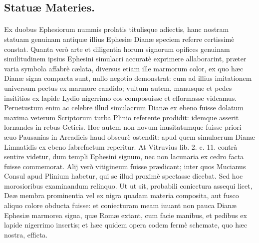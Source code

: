 \documentclass[a4paper, 11pt, oneside, polutonikogreek, latin]{article}
\begin{document}
\subsection{Statuæ Materies.}
\paragraph{}
Ex duobus Ephesiorum nummis prolatis titulisque adiectis, hanc nostram statuam genuinam antiquæ illius Ephesiæ Dianæ speciem referre certissimè constat. Quanta verò arte et diligentia horum signorum opifices genuinam similitudinem ipsius Ephesini simulacri accuratè exprimere allaborarint, præter varia symbola affabrè cælata, diversus etiam ille marmorum color, ex quo hæc Dianæ signa compacta sunt, nullo negotio demonstrat: cum ad illius imitationem universum pectus ex marmore candido; vultum autem, manusque et pedes insititios ex lapide Lydio nigerrimo eos composuisse et efformasse videamus. Peruetustum enim ac celebre illud simulacrum Dianæ ex ebeno fuisse dolatum maxima veterum Scriptorum turba Plinio referente prodidit: idemque asserit lornandes in rebus Geticis. Hoc autem non novum inusitatumque fuisse priori æuo Pausanias in Arcadicis haud obscurè ostendit: apud quem simulacrum Dianæ Limnatidis ex ebeno fabrefactum reperitur. At Vitruvius lib. 2. c. 11. contrà sentire videtur, dum templi Ephesini signum, nec non lacunaria ex cedro facta fuisse commemorat. Alij verò vitigineum fuisse prædicant; inter quos Mucianus Consul apud Plinium habetur, qui se illud proximè spectasse dicebat. Sed hoc morosioribus examinandum relinquo. Ut ut sit, probabili coniectura assequi licet, Deæ membra prominentia vel ex nigra quadam materia composita, aut fusco aliquo colore obducta fuisse: et coniecturam meam iuuant non pauca Dianæ Ephesiæ marmorea signa, quæ Romæ extant, cum facie manibus, et pedibus ex lapide nigerrimo insertis; et hæc quidem opera codem fermè schemate, quo hæc nostra, efficta.
\end{document}
